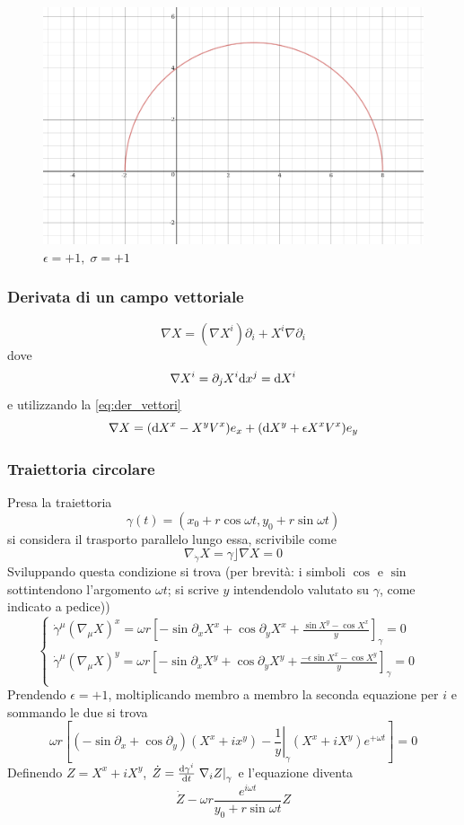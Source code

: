 \begin{figure}[htbp]
 \centering
 \includegraphics[width=\textwidth]{images/foglio3_pos_pos}
	\caption*{\(\epsilon=+1, \;\sigma=+1\)}
 \label{figure:pos_pos}
\end{figure}

\subsubsection*{Derivata di un campo vettoriale}
\[ \nabla X = (\nabla X^i) \partial_i + X^i \nabla\partial_i \]
dove 
\[ \nabla X^i = \partial_j X^i \mathrm{d} x^j = \mathrm{d} X^i \]
e utilizzando la \ref{eq:der_vettori}
\[ \nabla X = (\mathrm{d} X^x - X^yV^x) e_x + (\mathrm{d} X^y + \epsilon X^x V^x) e_y \]


\subsubsection{Traiettoria circolare}
Presa la traiettoria
\[ \gamma(t) = (x_0 + r\cos\omega t, y_0 + r\sin\omega t) \]
si considera il trasporto parallelo lungo essa, scrivibile come
\[ \nabla_{\dot{\gamma}} X = \gamma \rfloor \nabla X = 0 \]
Sviluppando questa condizione si trova (per brevit\`a: i simboli $\cos$ e $\sin$ sottintendono l'argomento $\omega t$; si scrive $y$ intendendolo valutato su $\gamma$, come indicato a pedice))
\[ \begin{cases}
	\dot{\gamma}^\mu (\nabla_\mu X)^x = \omega r \left[ -\sin \partial_x X^x + \cos \partial_y X^x
		+\frac{\sin X^y - \cos X^x}{y}\right]_\gamma = 0  & \\
	\dot{\gamma}^\mu (\nabla_\mu X)^y = \omega r \left[ -\sin \partial_x X^y + \cos \partial_y X^y
		+\frac{-\epsilon\sin X^x - \cos X^y}{y}\right]_\gamma = 0  & \\
   \end{cases}
\]
Prendendo \(\epsilon=+1\), moltiplicando membro a membro la seconda equazione per $i$ e sommando le due si trova
\[\omega r\left[(-\sin \partial_x+\cos \partial_y)(X^x+ix^y) - \left.\frac{1}{y}\right|_\gamma (X^x+iX^y) e^{+\omega t}\right] = 0 \]
Definendo \( Z = X^x +iX^y \), \(\dot{Z} = \frac{\mathrm{d} \gamma^i}{\mathrm{d} t}\left.\nabla_i Z \right|_\gamma\) e l'equazione diventa
\[ \dot{Z} - \omega r \frac{e^{i\omega t}}{y_0 + r\sin{\omega t}} Z \]

